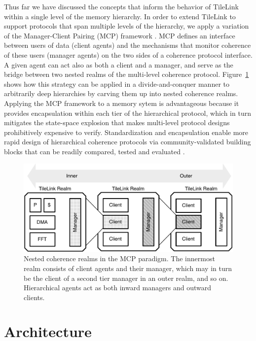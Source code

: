 Thus far we have discussed the concepts that inform the behavior of TileLink within a single level of the memory hierarchy.
In order to extend TileLink to support protocols that span multiple levels of the hierarchy, we apply a variation of the Manager-Client Pairing (MCP) framework \cite{beu2011manager}.
MCP defines an interface between users of data (client agents) and the mechanisms that monitor coherence of these users (manager agents) on the two sides of a coherence protocol interface.
A given agent can act also as both a client and a manager, and serve as the bridge between two nested realms of the multi-level coherence protocol.
Figure~\ref{fig:mcp} shows how this strategy can be applied in a divide-and-conquer manner to arbitrarily deep hierarchies
by carving them up into nested coherence realms.
Applying the MCP framework to a memory sytem is advantageous because it provides
encapsulation within each tier of the hierarchical protocol,
which in turn mitigates the state-space explosion
that makes multi-level protocol designs prohibitively expensive to verify.
Standardization and encapsulation enable more rapid
design of hierarchical coherence protocols via community-validated
building blocks that can be readily compared, tested and evaluated \cite{beu2011manager}.

\begin{figure}[]
\centering
\includegraphics[width=1\columnwidth]{tilelink/figures/mcp-realm.pdf}
\caption[Nested coherence realms in the MCP paradigm.]{
Nested coherence realms in the MCP paradigm. 
The innermost realm consists of client agents and their manager, which may in
turn be the client of a second tier manager in an outer realm, and so on.
Hierarchical agents act as both inward managers and outward clients. }
\label{fig:mcp}
\end{figure}

\section{Architecture}
\label{s.arch}

